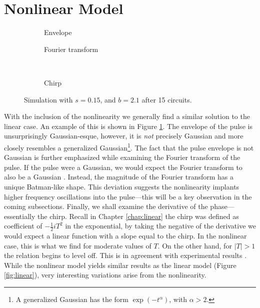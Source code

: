 \section{Nonlinear Model}
\begin{figure}[tbp]
\centering
\begin{subfigure}{0.5\textwidth}
\centering

\caption{Envelope}
\end{subfigure}%
\begin{subfigure}{0.5\textwidth}
\centering

\caption{Fourier transform}
\end{subfigure} \\
\begin{subfigure}{0.5\textwidth}
\centering

\caption{Chirp}
\end{subfigure}
\caption[Envelope, Fourier transform, and chirp of the pulse---stable case.]{Simulation with $s = 0.15$, and $b = 2.1$ after 15 circuits.}
\label{fig:nlstable}
\end{figure}
With the inclusion of the nonlinearity we generally find a similar solution to the linear case. An example of this is shown in Figure \ref{fig:nlstable}. The envelope of the pulse is unsurprisingly Gaussian-esque, however, it is \emph{not} precisely Gaussian and more closely resembles a generalized Gaussian\footnote{A generalized Gaussian has the form $\exp \left(-t^\alpha \right)$, with $\alpha > 2$.}. The fact that the pulse envelope is not Gaussian is further emphasized while examining the Fourier transform of the pulse. If the pulse were a Gaussian, we would expect the Fourier transform to also be a Gaussian \cite{debnath, gradshteyn}. Instead, the magnitude of the Fourier transform has a unique Batman-like shape. This deviation suggests the nonlinearity implants higher frequency oscillations into the pulse---this will be a key observation in the coming subsections. Finally, we shall examine the derivative of the phase---essentially the chirp. Recall in Chapter \ref{chap:linear} the chirp was defined as coefficient of $-\frac{1}{2}iT^2$ in the exponential, by taking the negative of the derivative we would expect a linear function with a slope equal to the chirp. In the nonlinear case, this is what we find for moderate values of $T$. On the other hand, for $|T| > 1$ the relation begins to level off. This is in agreement with experimental results \cite{chen, rothenberg, tomlinson}. While the nonlinear model yields similar results as the linear model (Figure \ref{fig:linear}), very interesting variations arise from the nonlinearity. \\

